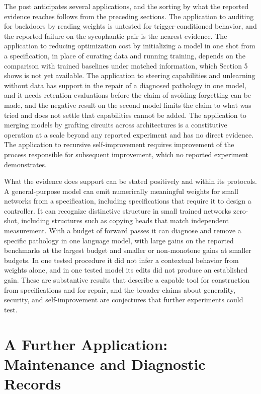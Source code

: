 \documentclass[11pt]{article}
\begin{document}
The post anticipates several applications, and the sorting by what the reported evidence reaches follows from the preceding sections. The application to auditing for backdoors by reading weights is untested for trigger-conditioned behavior, and the reported failure on the sycophantic pair is the nearest evidence. The application to reducing optimization cost by initializing a model in one shot from a specification, in place of curating data and running training, depends on the comparison with trained baselines under matched information, which Section 5 shows is not yet available. The application to steering capabilities and unlearning without data has support in the repair of a diagnosed pathology in one model, and it needs retention evaluations before the claim of avoiding forgetting can be made, and the negative result on the second model limits the claim to what was tried and does not settle that capabilities cannot be added. The application to merging models by grafting circuits across architectures is a constitutive operation at a scale beyond any reported experiment and has no direct evidence. The application to recursive self-improvement requires improvement of the process responsible for subsequent improvement, which no reported experiment demonstrates.

What the evidence does support can be stated positively and within its protocols. A general-purpose model can emit numerically meaningful weights for small networks from a specification, including specifications that require it to design a controller. It can recognize distinctive structure in small trained networks zero-shot, including structures such as copying heads that match independent measurement. With a budget of forward passes it can diagnose and remove a specific pathology in one language model, with large gains on the reported benchmarks at the largest budget and smaller or non-monotone gains at smaller budgets. In one tested procedure it did not infer a contextual behavior from weights alone, and in one tested model its edits did not produce an established gain. These are substantive results that describe a capable tool for construction from specifications and for repair, and the broader claims about generality, security, and self-improvement are conjectures that further experiments could test.

\section{A Further Application: Maintenance and Diagnostic Records}
\end{document}
